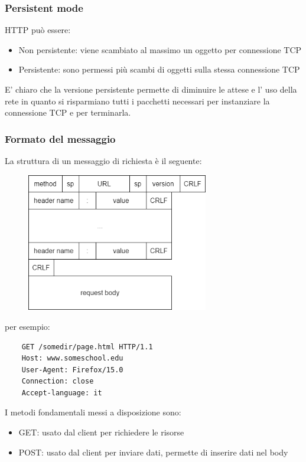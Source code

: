 \subsubsection{Persistent mode}
HTTP può essere:
\begin{itemize}
    \item Non persistente: viene scambiato al massimo un oggetto per connessione TCP
    \item Persistente: sono permessi più scambi di oggetti sulla stessa connessione TCP
\end{itemize}
E' chiaro che la versione persistente permette di diminuire le attese e l' uso della rete in quanto si risparmiano tutti i pacchetti necessari per instanziare la connessione TCP e per terminarla.

\subsubsection{Formato del messaggio}

La struttura di un messaggio di richiesta è il seguente:
\begin{figure}[H]
    \centering
    \includegraphics[width=300px]{images/2_Applicazioni_di_rete/HTTP_request.png}
\end{figure}
per esempio:
\begin{verbatim}
    GET /somedir/page.html HTTP/1.1
    Host: www.someschool.edu
    User-Agent: Firefox/15.0
    Connection: close
    Accept-language: it
\end{verbatim}

I metodi fondamentali messi a disposizione sono:
\begin{itemize}
    \item GET: usato dal client per richiedere le risorse
    \item POST: usato dal client per inviare dati, permette di inserire dati nel body
\end{itemize}

